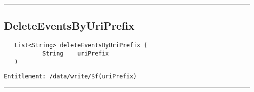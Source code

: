 \rule{12cm}{2pt}
\subsection{DeleteEventsByUriPrefix}
\label{Api:DeleteEventsByUriPrefix}
\begin{Verbatim}
   List<String> deleteEventsByUriPrefix (
           String    uriPrefix
   )
\end{Verbatim}
\begin{Verbatim}[formatcom=\color{Maroon}]
  Entitlement: /data/write/$f(uriPrefix)
\end{Verbatim}



\rule{12cm}{2pt}
